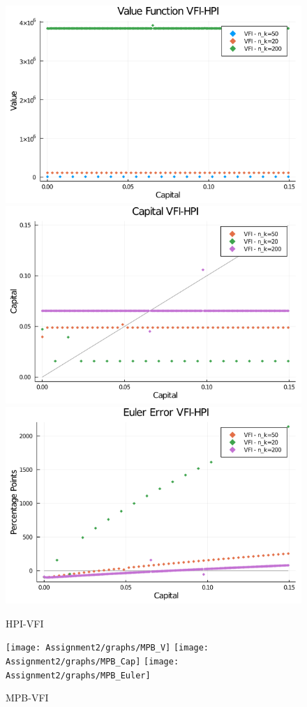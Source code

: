 \documentclass[]{article}
\begin{document}
\begin{figure}

{\centering \includegraphics[width=0.65\linewidth]{Assignment2/graphs/HPI_V} \includegraphics[width=0.65\linewidth]{Assignment2/graphs/HPI_Cap} \includegraphics[width=0.65\linewidth]{Assignment2/graphs/HPI_Euler} 

}

\caption{HPI-VFI}\label{fig:unnamed-chunk-3}
\end{figure}

\begin{figure}

{\centering \texttt{[image: Assignment2/graphs/MPB\_V]} \texttt{[image: Assignment2/graphs/MPB\_Cap]} \texttt{[image: Assignment2/graphs/MPB\_Euler]} 

}

\caption{MPB-VFI}\label{fig:unnamed-chunk-4}
\end{figure}
\end{document}
